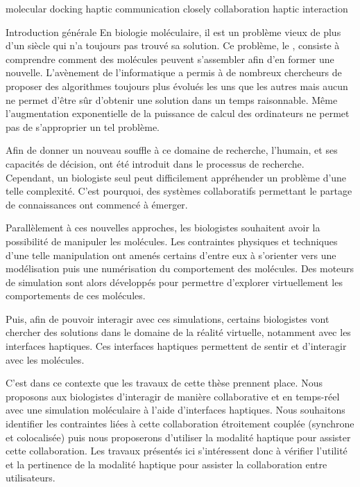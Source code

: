 \documentclass[myfrancais,ngerman,english,french]{mythesis}
\begin{document}
	\begin{myabstract}[english]
		\begin{mykeywords}
			\mykeyword molecular docking
			\mykeyword haptic communication
			\mykeyword closely collaboration
			\mykeyword haptic interaction
		\end{mykeywords}
	\end{myabstract}
	\mainmatter
	\begin{mychapter+}{Introduction générale}
		En biologie moléculaire, il est un problème vieux de plus d'un siècle qui n'a toujours pas trouvé sa solution.
		Ce problème, le , consiste à comprendre comment des molécules peuvent s'assembler afin d'en former une nouvelle.
		L'avènement de l'informatique a permis à de nombreux chercheurs de proposer des algorithmes toujours plus évolués les uns que les autres mais aucun ne permet d'être sûr d'obtenir une solution dans un temps raisonnable.
		Même l'augmentation exponentielle de la puissance de calcul des ordinateurs ne permet pas de s'approprier un tel problème.

		Afin de donner un nouveau souffle à ce domaine de recherche, l'humain, et ses capacités de décision, ont été introduit dans le processus de recherche.
		Cependant, un biologiste seul peut difficilement appréhender un problème d'une telle complexité.
		C'est pourquoi, des systèmes collaboratifs permettant le partage de connaissances ont commencé à émerger.

		Parallèlement à ces nouvelles approches, les biologistes souhaitent avoir la possibilité de manipuler les molécules.
		Les contraintes physiques et techniques d'une telle manipulation ont amenés certains d'entre eux à s'orienter vers une modélisation puis une numérisation du comportement des molécules.
		Des moteurs de simulation sont alors développés pour permettre d'explorer virtuellement les comportements de ces molécules.

		Puis, afin de pouvoir interagir avec ces simulations, certains biologistes vont chercher des solutions dans le domaine de la réalité virtuelle, notamment avec les interfaces haptiques.
		Ces interfaces haptiques permettent de sentir et d'interagir avec les molécules.

		C'est dans ce contexte que les travaux de cette thèse prennent place.
		Nous proposons aux biologistes d'interagir de manière collaborative et en temps-réel avec une simulation moléculaire à l'aide d'interfaces haptiques.
		Nous souhaitons identifier les contraintes liées à cette collaboration étroitement couplée (synchrone et colocalisée) puis nous proposerons d'utiliser la modalité haptique pour assister cette collaboration.
		Les travaux présentés ici s'intéressent donc à vérifier l'utilité et la pertinence de la modalité haptique pour assister la collaboration entre utilisateurs.


\end{mychapter+}
\end{document}
